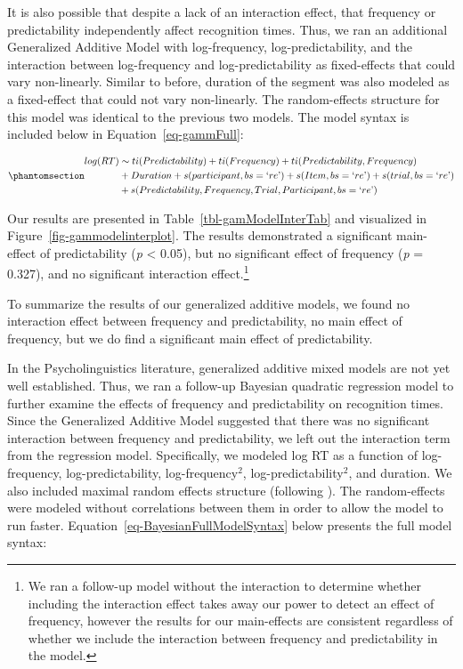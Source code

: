 \documentclass[
  12pt,
  letterpaper,
]{scrreprt}
\begin{document}
It is also possible that despite a lack of an interaction effect, that
frequency or predictability independently affect recognition times.
Thus, we ran an additional Generalized Additive Model with
log-frequency, log-predictability, and the interaction between
log-frequency and log-predictability as fixed-effects that could vary
non-linearly. Similar to before, duration of the segment was also
modeled as a fixed-effect that could not vary non-linearly. The
random-effects structure for this model was identical to the previous
two models. The model syntax is included below in
Equation~\ref{eq-gammFull}:

\begin{equation}\phantomsection\label{eq-gammFull}{
\begin{aligned}log(RT) & \sim ti(Predictability) + ti(Frequency) + ti(Predictability, Frequency) \\ & + Duration + s(participant, bs = \text{`}re\text{'}) + s(Item, bs = \text{`}re\text{'})  + s(trial, bs = \text{`}re\text{'}) \\ & + s(Predictability, Frequency, Trial, Participant, bs = \text{`}re\text{'}) \end{aligned}
}\end{equation}

Our results are presented in Table~\ref{tbl-gamModelInterTab} and
visualized in Figure~\ref{fig-gammodelinterplot}. The results
demonstrated a significant main-effect of predictability (\emph{p}
\textless{} 0.05), but no significant effect of frequency (\emph{p} =
0.327), and no significant interaction effect.\footnote{We ran a
  follow-up model without the interaction to determine whether including
  the interaction effect takes away our power to detect an effect of
  frequency, however the results for our main-effects are consistent
  regardless of whether we include the interaction between frequency and
  predictability in the model.}

To summarize the results of our generalized additive models, we found no
interaction effect between frequency and predictability, no main effect
of frequency, but we do find a significant main effect of
predictability.

In the Psycholinguistics literature, generalized additive mixed models
are not yet well established. Thus, we ran a follow-up Bayesian
quadratic regression model to further examine the effects of frequency
and predictability on recognition times. Since the Generalized Additive
Model suggested that there was no significant interaction between
frequency and predictability, we left out the interaction term from the
regression model. Specifically, we modeled log RT as a function of
log-frequency, log-predictability, log-frequency\(^2\),
log-predictability\(^2\), and duration. We also included maximal random
effects structure (following
). The
random-effects were modeled without correlations between them in order
to allow the model to run faster.
Equation~\ref{eq-BayesianFullModelSyntax} below presents the full model
syntax:
\end{document}
